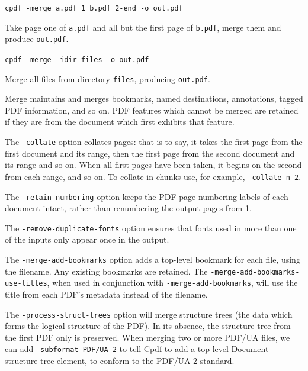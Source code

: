 \documentclass{book}
\begin{document}
  \begin{framed}\small
    \noindent\verb!cpdf -merge a.pdf 1 b.pdf 2-end -o out.pdf!

    \vspace{2.5mm}
    \noindent Take page one of \texttt{a.pdf} and all but the first page of
\texttt{b.pdf}, merge them and produce \texttt{out.pdf}.

    \vspace{1.5mm}
    \noindent\verb!cpdf -merge -idir files -o out.pdf!

    \vspace{2.5mm}
    \noindent Merge all files from directory \texttt{files}, producing \texttt{out.pdf}.

  \end{framed}

\noindent Merge maintains and merges bookmarks, named destinations, annotations, tagged PDF information, and so on. PDF features which cannot be merged are retained if they are from
the document which first exhibits that feature.

The \texttt{-collate} option collates pages: that is to say, it takes the first page from the first document and its range, then the first page from the second document and its range and so on. When all first pages have been taken, it begins on the second from each range, and so on. To collate in chunks use, for example, \texttt{-collate-n 2}.

The \texttt{-retain-numbering} option keeps the PDF page numbering labels of
each document intact, rather than renumbering the output pages from 1.

The \texttt{-remove-duplicate-fonts} option ensures that fonts used in more than one
of the inputs only appear once in the output.

The \texttt{-merge-add-bookmarks} option adds a top-level bookmark for each file, using the filename. Any existing bookmarks are retained. The \texttt{-merge\--add\--bookmarks\--use\--titles}, when used in conjunction with \texttt{-merge-add-bookmarks}, will use the title from each PDF's metadata instead of the filename.

The \texttt{-process-struct-trees} option will merge structure trees (the data which forms the logical structure of the PDF). In its absence, the structure tree from the first PDF only is preserved. When merging two or more PDF/UA files, we can add \texttt{-subformat PDF/UA-2} to tell Cpdf to add a top-level Document structure tree element, to conform to the PDF/UA-2 standard.
\end{document}
